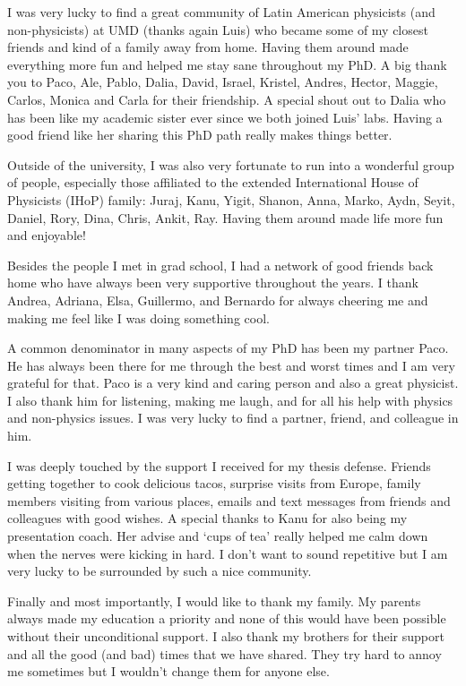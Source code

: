 I was very lucky to find a great community of Latin American physicists (and non-physicists) at UMD (thanks again Luis) who became some of my closest friends and kind of a family away from home. Having them around made everything more fun and helped me stay sane throughout my PhD. A big thank you to Paco, Ale, Pablo, Dalia, David, Israel, Kristel, Andres, Hector, Maggie, Carlos, Monica and Carla for their friendship. A special shout out to Dalia who has been like my academic sister ever since we both joined Luis' labs. Having a good friend like her sharing this PhD path really makes things better.  

Outside of the university, I was also very fortunate to run into a wonderful group of people, especially those affiliated to the extended International House of Physicists (IHoP) family: Juraj, Kanu, Yigit, Shanon, Anna, Marko, Aydn, Seyit, Daniel, Rory, Dina, Chris, Ankit, Ray. Having them around made life more fun and enjoyable! 

Besides the people I met in grad school, I had a network of good friends back home who have always been very supportive throughout the years. I thank Andrea, Adriana, Elsa, Guillermo, and Bernardo for always cheering me and making me feel like I was doing something cool. 

A common denominator in many aspects of my PhD has been my partner Paco. He has always been there for me through the best and worst times and I am very grateful for that. Paco is a very kind and caring person and also a great physicist. I also thank him for listening, making me laugh, and for all his help with physics and non-physics issues. I was very lucky to find a partner, friend, and colleague in him. 

I was deeply touched by the support I received for my thesis defense. Friends getting together to cook delicious tacos, surprise visits from Europe, family members visiting from various places, emails and text messages from friends and colleagues with good wishes. A special thanks to Kanu for also being my presentation coach. Her advise and `cups of tea' really helped me calm down when the nerves were kicking in hard. I don't want to sound repetitive but I am very lucky to be surrounded by such a nice community. 

Finally and most importantly, I would like to thank my family. My parents always made my education a priority and none of this would have been possible without their unconditional support. I also thank my brothers for their support and all the good (and bad) times that we have shared. They try hard to annoy me sometimes but I wouldn't change them for anyone else. 

